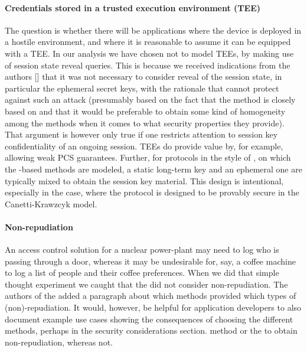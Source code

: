 \documentclass[runningheads,draft,x11names]{llncs}
\begin{document}
\paragraph{Credentials stored in a trusted execution environment (TEE)}
The question is whether there will be applications where the device is
deployed in a hostile environment, and where it is reasonable to assume it can
be equipped with a TEE.
%
In our analysis we have chosen not to model TEEs, by making use of session
state reveal queries.
%
This is because we received indications from the \mSpec{} authors [\mcneed] that it was not
necessary to consider reveal of the session state, in particular the ephemeral
secret keys, with the rationale that \mSigma{} cannot protect against such an
attack (presumably based on the fact that the \mSigSig{} method is closely based on
\mSigmaI{} and that it would be preferable to obtain some kind of homogeneity
among the \mEdhoc{} methods when it comes to what security properties they
provide).
%
That argument is however only true if one restricts attention to session key
confidentiality of an ongoing session.
%
TEEs do provide value by, for example, allowing weak PCS guarantees.
%
Further, for protocols in the style of \mOptls{}, on which the \mStat{}-based
methods are modeled, a static long-term
key and an ephemeral one are typically mixed to obtain the session key material.
%
This design is intentional, especially in the \mOptls{} case, where the protocol
is designed to be provably secure in the Canetti-Krawzcyk model.
%

\paragraph{Non-repudiation}
An access control solution for a nuclear power-plant may need to log who is
passing through a door, whereas it may be undesirable for, say, a coffee machine to log a list of people and their coffee preferences. %
%
When we did that simple thought experiment we caught that the \mSpec{} did not
consider non-repudiation.
%
The authors of the \mSpec{} added a paragraph about which methods provided which
types of (non)-repudiation.
%
It would, however, be helpful for application developers to also document
example use cases showing the consequences of choosing the different methods,
perhaps in the security considerations section.
%
 \mPsk{} method or the  to obtain
non-repudiation, whereas  not.
\end{document}

